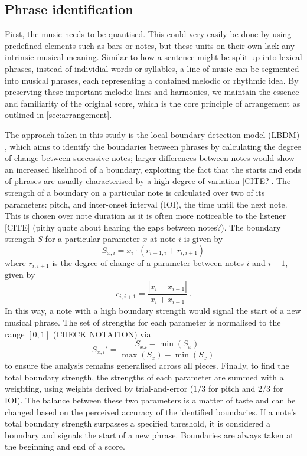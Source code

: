 \documentclass[12pt]{article}
\theoremstyle{definition}
\begin{document}
\subsection{Phrase identification}

First, the music needs to be quantised. This could very easily be done by using predefined elements such as bars or notes, but these units on their own lack any intrinsic musical meaning. Similar to how a sentence might be split up into lexical phrases, instead of individial words or syllables, a line of music can be segmented into musical phrases, each representing a contained melodic or rhythmic idea. By preserving these important melodic lines and harmonies, we maintain the essence and familiarity of the original score, which is the core principle of arrangement as outlined in \cref{sec:arrangement}.

The approach taken in this study is the local boundary detection model (LBDM) \cite{cambouropoulos_lbdm_2011}, which aims to identify the boundaries between phrases by calculating the degree of change between successive notes; larger differences between notes would show an increased likelihood of a boundary, exploiting the fact that the starts and ends of phrases are usually characterised by a high degree of variation [CITE?]. The strength of a boundary on a particular note is calculated over two of its parameters: pitch, and inter-onset interval (IOI), the time until the next note. This is chosen over note duration as it is often more noticeable to the listener [CITE] (pithy quote about hearing the gaps between notes?). The boundary strength $S$ for a particular parameter $x$ at note $i$ is given by
\begin{equation}
    S_{x,i}=x_i\cdot (r_{i-1, i} + r_{i, i+1})
    \label{eq:boundary-strength}
\end{equation}
where $r_{i, i+1}$ is the degree of change of a parameter between notes $i$ and $i+1$, given by
\begin{equation}
    r_{i, i+1}=\frac{|x_{i}-x_{i+1}|}{x_{i}+x_{i+1}} \,.
    \label{eq:degree-change}
\end{equation}
In this way, a note with a high boundary strength would signal the start of a new musical phrase. The set of strengths for each parameter is normalised to the range $[0,1]$ (CHECK NOTATION) via
\begin{equation}
    S_{x,i}'=\frac{S_{x.i}-\min(S_x)}{\max(S_x)-\min(S_x)}
    \label{eq:normalisation}
\end{equation}
to ensure the analysis remains generalised across all pieces.
Finally, to find the total boundary strength, the strengths of each parameter are summed with a weighting, using weights derived by trial-and-error ($1/3$ for pitch and $2/3$ for IOI). The balance between these two parameters is a matter of taste and can be changed based on the perceived accuracy of the identified boundaries. If a note's total boundary strength surpasses a specified threshold, it is considered a boundary and signals the start of a new phrase. Boundaries are always taken at the beginning and end of a score.
\end{document}
